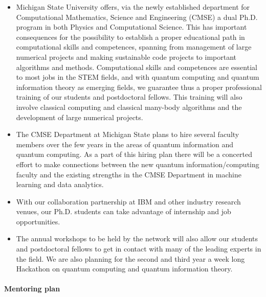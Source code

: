 \documentclass[10pt]{article}
\begin{document}
\begin{itemize}
    \item Michigan State University offers, via the newly established department for Computational Mathematics, Science and Engineering (CMSE) a dual Ph.D. program in both Physics and Computational Science. This has important consequences for the possibility to establish a proper educational path in computational skills and competences, spanning from management of large numerical projects and making sustainable code projects to important algorithms and methods. Computational skills and competences are essential to most jobs in the STEM fields, and with quantum computing and quantum information theory as emerging fields, we guarantee thus a proper professional training of our students and postdoctoral fellows. This training will also involve classical computing and classical many-body algorithms and the development of large numerical projects.  
    \item The CMSE Department at Michigan State plans to hire several faculty members over the few years in the areas of quantum information and quantum computing.  As a part of this hiring plan there will be a concerted effort to make connections between the new quantum information/computing faculty and the existing strengths in the CMSE Department in machine learning and data analytics.
    \item With our collaboration partnership at IBM and other industry research venues, our Ph.D. students can take advantage of internship and job opportunities. 
    \item The annual workshops to be held by the network will also allow our students and postdoctoral fellows to get in contact with many of the leading experts in the field. We are also planning for the second and third year a week long Hackathon on quantum computing and quantum information theory.
\end{itemize}

\paragraph{Mentoring plan}
\end{document}
